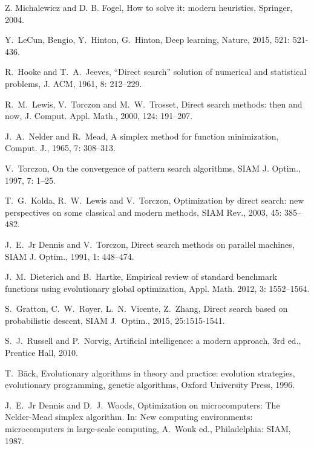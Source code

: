 \documentclass[mathpazo]{aamm}
\begin{document}
\begin{thebibliography}{99}
Z. Michalewicz and D. B. Fogel, How to solve it: modern
heuristics, Springer, 2004.

Y.~LeCun, Bengio, Y.~Hinton, G.~Hinton, Deep learning, Nature,
2015, 521: 521-436.

R.~Hooke and T.~A.~Jeeves,
``Direct search'' solution of numerical and statistical problems,
{J. ACM}, 1961, 8: 212--229.

R.~M.~Lewis, V.~Torczon and M.~W.~Trosset,
Direct search methods: then and now,
{J. Comput. Appl. Math.},
2000, 124: 191--207.

J.~A.~Nelder and R.~Mead,
A simplex method for function minimization,
{Comput. J.}, 1965, 7: 308--313.

V.~Torczon,
On the convergence of pattern search algorithms,
{SIAM J. Optim.}, 1997, 7: 1--25.

T.~G.~Kolda, R.~W.~Lewis and V.~Torczon,
Optimization by direct search: new perspectives on some classical
and modern methods,
{SIAM Rev.}, 2003, 45: 385--482.

J.~E.~Jr Dennis and V.~Torczon,
Direct search methods on parallel machines,
{SIAM J. Optim.}, 1991, 1: 448--474.

J.~M.~Dieterich and B.~Hartke, 
Empirical review of standard benchmark functions using evolutionary global optimization,
{Appl. Math.} 2012, 3: 1552--1564.

S.~Gratton, C.~W.~Royer, L.~N.~Vicente, Z.~Zhang, Direct search
based on probabilistic descent, SIAM J.~Optim., 
2015, 25:1515-1541.

S.~J.~Russell and P.~Norvig,  Artificial intelligence: a modern
approach, 3rd ed., Prentice Hall, 2010.

T.~B{\"a}ck, 
Evolutionary algorithms in theory and practice: evolution
  strategies, evolutionary programming, genetic algorithms,
Oxford University Press, 1996.

J.~E.~Jr Dennis and D.~J.~Woods,
Optimization on microcomputers: The Nelder-Mead simplex algorithm.
In: New computing environments: microcomputers in large-scale
computing, A.~Wouk ed., Philadelphia: SIAM, 1987.

\end{thebibliography}
\end{document}
